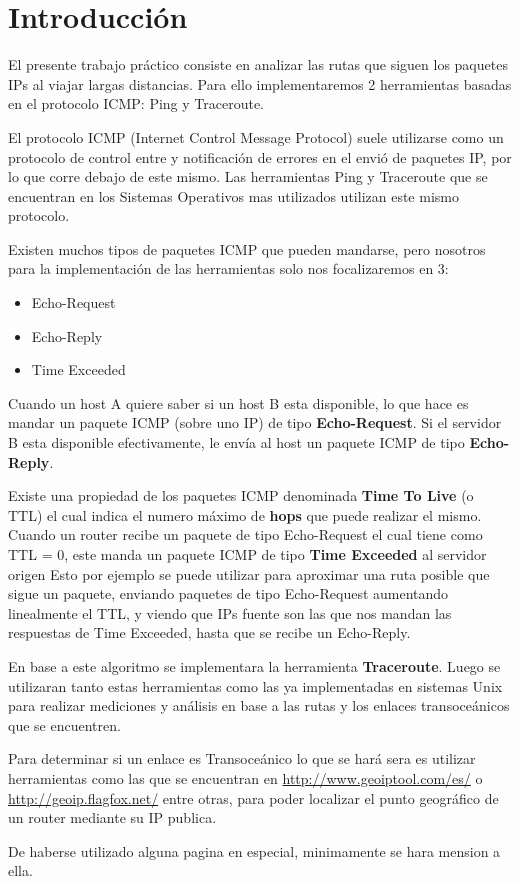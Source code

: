 \section{Introducci\'on}

El presente trabajo pr\'actico consiste en analizar las rutas que siguen los paquetes IPs al viajar largas distancias. Para ello implementaremos 2 herramientas basadas en el protocolo ICMP:
Ping y Traceroute.

El protocolo ICMP (Internet Control Message Protocol) suele utilizarse como un protocolo de control entre y notificaci\'on de errores en el envi\'o de paquetes IP, por lo que corre debajo de este mismo. Las herramientas Ping y Traceroute que se encuentran en los Sistemas Operativos mas utilizados utilizan este mismo protocolo.

Existen muchos tipos de paquetes ICMP que pueden mandarse, pero nosotros para la implementaci\'on de las herramientas solo nos focalizaremos en 3:

\begin{itemize}
 \item Echo-Request
 \item Echo-Reply
 \item Time Exceeded
\end{itemize}

Cuando un host A quiere saber si un host B esta disponible, lo que hace es mandar un paquete ICMP (sobre uno IP) de tipo {\bf Echo-Request}. Si el servidor B esta disponible efectivamente, le env\'ia al host un paquete ICMP de tipo {\bf Echo-Reply}.

Existe una propiedad de los paquetes ICMP denominada {\bf Time To Live} (o TTL) el cual indica el numero m\'aximo de {\bf hops} que puede realizar el mismo. Cuando un router recibe un paquete de tipo Echo-Request el cual tiene como TTL = 0, este manda un paquete ICMP de tipo {\bf Time Exceeded} al servidor origen Esto por ejemplo se puede utilizar para aproximar una ruta posible que sigue un paquete, enviando paquetes de tipo Echo-Request aumentando linealmente el TTL, y viendo que IPs fuente son las que nos mandan las respuestas de Time Exceeded, hasta que se recibe un Echo-Reply.

En base a este algoritmo se implementara la herramienta {\bf Traceroute}. Luego se utilizaran tanto estas herramientas como las ya implementadas en sistemas Unix para realizar mediciones y an\'alisis en base a las rutas y los enlaces transoce\'anicos que se encuentren.

Para determinar si un enlace es Transoce\'anico lo que se har\'a sera es utilizar herramientas como las que se encuentran en \url{http://www.geoiptool.com/es/} o \url{http://geoip.flagfox.net/} entre otras, para poder localizar el punto geogr\'afico de un router mediante su IP publica.

De haberse utilizado alguna pagina en especial, minimamente se hara mension a ella.

